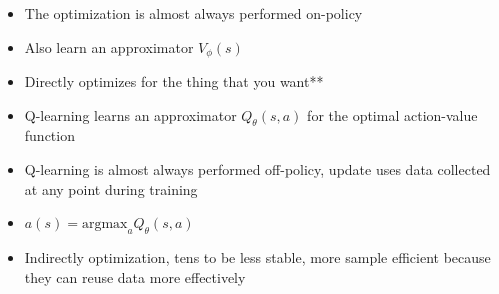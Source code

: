\documentclass[../main.tex]{subfiles}
\begin{document}
\begin{itemize}
\begin{itemize}
        \item The optimization is almost always performed on-policy
        \item Also learn an approximator $V_{\phi}(s)$
        \item Directly optimizes for the thing that you want**
      \end{itemize}
      \begin{itemize}
        \item Q-learning learns an approximator $Q_{\theta}(s,a)$ for the optimal action-value function
        \item Q-learning is almost always performed off-policy, update uses data collected at any point during training
        \item $a(s) = \text{argmax}_{a}Q_{\theta}(s,a)$
        \item Indirectly optimization, tens to be less stable, more sample efficient because they can reuse data more effectively
      \end{itemize}
    \end{itemize}
\end{document}
